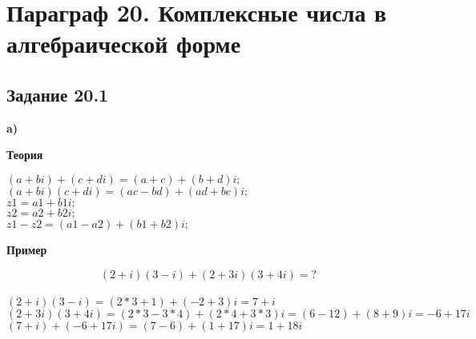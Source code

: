 \documentclass{article}
\begin{document}
\tableofcontents
\newpage
\section{Параграф 20. Комплексные числа в алгебраической форме}
\subsection{Задание 20.1}
\textbf{a)}\\
\begin{center}\textbf{Теория}\end{center}
$ (a+bi) + (c+di) = (a+c)+(b+d)i; $ \\
$ (a+bi)(c+di) = (ac-bd)+(ad+bc)i; $\\
$ z1 = a1+b1i;$\\
$ z2 = a2+b2i;$\\
$ z1 - z2 = (a1-a2)+(b1+b2)i; $
\begin{center}\textbf{Пример}\end{center}
$$(2+i)(3-i)+(2+3i)(3+4i) = ?$$\\
$(2+i)(3-i)=(2*3+1)+(-2+3)i = 7+i$\\
$(2+3i)(3+4i) =(2*3-3*4)+( 2* 4+3*3)i=(6-12)+(8+9)i=-6+17i$\\
$(7+i)+(-6+17i)=(7-6)+(1+17)i=1+18i$
\end{document}
